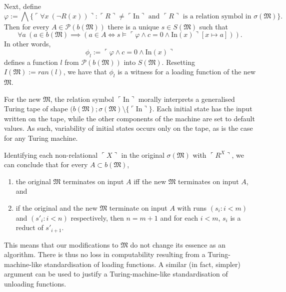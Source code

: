 \documentclass[12pt]{article}
\numberwithin{equation}{section}
\begin{document}
Next, define 
\begin{equation*}
    \varphi := \bigwedge \{\ulcorner \forall x \ (\neg R(x)) \urcorner : \ulcorner R \urcorner \neq \ulcorner \mathrm{In} \urcorner \text{ and } \ulcorner R \urcorner \text{ is a relation symbol in } \sigma(\mathfrak{M})\} \text{.}
\end{equation*}
Then for every $A \in \mathcal{P}(b(\mathfrak{M}))$ there is a unique $s \in S(\mathfrak{M})$ such that 
\begin{equation*}
    \forall a \ (a \in b(\mathfrak{M}) \implies (a \in A \iff s \models \ulcorner \varphi \wedge c = 0 \wedge \mathrm{In}(x) \urcorner [x \mapsto a])) \text{.}
\end{equation*}
In other words, 
\begin{equation*}
    \phi_l := \ulcorner \varphi \wedge c = 0 \wedge \mathrm{In}(x) \urcorner
\end{equation*}
defines a function $l$ from $\mathcal{P}(b(\mathfrak{M}))$ into $S(\mathfrak{M})$. Resetting $I(\mathfrak{M}) := ran(l)$, we have that $\phi_l$ is a witness for a loading function of the new $\mathfrak{M}$. 

For the new $\mathfrak{M}$, the relation symbol $\ulcorner \mathrm{In} \urcorner$ morally interprets a generalised Turing tape of shape $(b(\mathfrak{M}); \sigma(\mathfrak{M}) \setminus \{\ulcorner \mathrm{In} \urcorner\}$. Each initial state has the input written on the tape, while the other components of the machine are set to default values. As such, variability of initial states occurs only on the tape, as is the case for any Turing machine. 

Identifying each non-relational $\ulcorner X \urcorner$ in the original $\sigma(\mathfrak{M})$ with $\ulcorner R^X \urcorner$, we can conclude that for every $A \subset b(\mathfrak{M})$, 
\begin{enumerate}[label=(\arabic*)]
    \item the original $\mathfrak{M}$ terminates on input $A$ iff the new $\mathfrak{M}$ terminates on input $A$, and
    \item if the original and the new $\mathfrak{M}$ terminate on input $A$ with runs $(s_i : i < m)$ and $(s'_i : i < n)$ respectively, then $n = m + 1$ and for each $i < m$, $s_i$ is a reduct of $s'_{i+1}$.
\end{enumerate} 
This means that our modifications to $\mathfrak{M}$ do not change its essence as an algorithm. There is thus no loss in computability resulting from a Turing-machine-like standardisation of loading functions. A similar (in fact, simpler) argument can be used to justify a Turing-machine-like standardisation of unloading functions.
\end{document}
